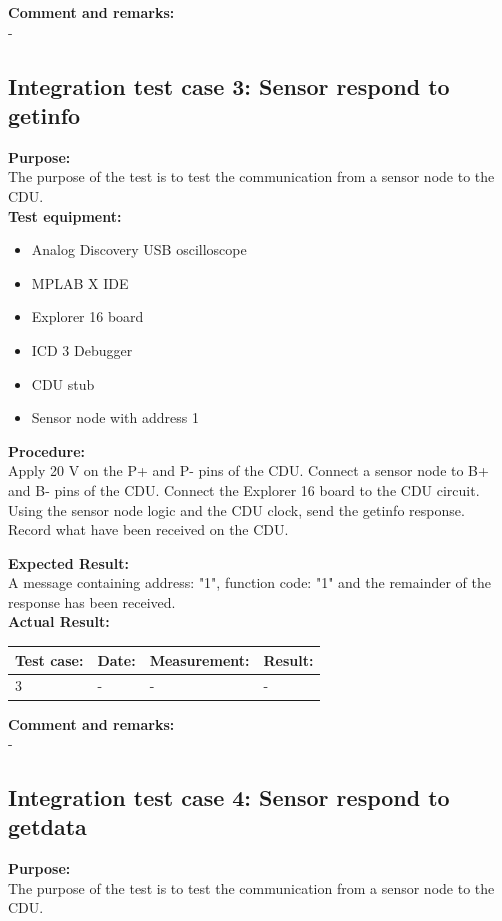 \textbf{Comment and remarks:}\\
-\\

\subsection{Integration test case 3: Sensor respond to getinfo}
\textbf{Purpose:}\\
The purpose of the test is to test the communication from a sensor node to the CDU.\\

\textbf{Test equipment:}
\begin{itemize}
\item Analog Discovery USB oscilloscope
\item MPLAB X IDE
\item Explorer 16 board
\item ICD 3 Debugger
\item CDU stub
\item Sensor node with address 1
\end{itemize}

\textbf{Procedure:}\\
Apply 20 V on the P+ and P- pins of the CDU. Connect a sensor node to B+ and B- pins of the CDU. Connect the Explorer 16 board to the CDU circuit. Using the sensor node logic and the CDU clock, send the getinfo response. Record what have been received on the CDU.

\textbf{Expected Result:}\\
A message containing address: "1", function code: "1" and the remainder of the response has been received.\\

\textbf{Actual Result:}\\
\begin{table}[H]
\centering
\begin{tabular}{|p{2cm}|p{2cm}|p{3cm}|p{2cm}|}\hline
\textbf{Test case:} & \textbf{Date:} & \textbf{Measurement:} & \textbf{Result:} \\ \hline
3 & - & - & - \\ \hline
\end{tabular}
\end{table}


\textbf{Comment and remarks:}\\
-\\

\subsection{Integration test case 4: Sensor respond to getdata}
\textbf{Purpose:}\\
The purpose of the test is to test the communication from a sensor node to the CDU.\\

